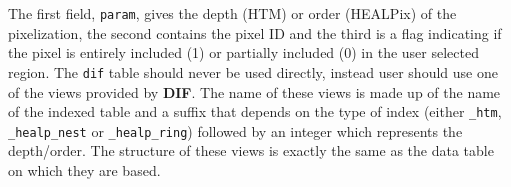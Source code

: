 \documentclass[10pt,titlepage]{article}
\newcommand{\dif}{\textbf{\small DIF}}
\begin{document}
The first field, \verb|param|, gives the depth (HTM) or order
(HEALPix) of the pixelization, the second contains the pixel ID and
the third is a flag indicating if the pixel is entirely included (1)
or partially included (0) in the user selected region. The
\texttt{dif} table should never be used directly, instead user should
use one of the views provided by \dif. The name of these views is made
up of the name of the indexed table and a suffix that depends on the
type of index (either \verb|_htm|, \verb|_healp_nest| or
\verb|_healp_ring|) followed by an integer which represents the
depth/order.  The structure of these views is exactly the same as the
data table on which they are based.


%
%
%
\end{document}
